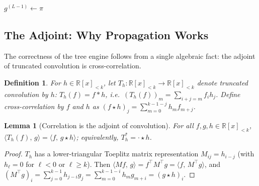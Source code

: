 \documentclass[11pt]{article}
\newtheorem{lemma}[theorem]{Lemma}
\newtheorem{definition}[theorem]{Definition}
\newcommand{\ip}[2]{\langle #1,\, #2 \rangle}
\begin{document}
\begin{algorithm}[H]
\caption{Tree Build and Propagate}\label{alg:tree}
\DontPrintSemicolon
\SetAlgoLined
{}
\BlankLine
{}
\BlankLine
{}
$g^{(L-1)} \leftarrow \pi$\;
\end{algorithm}

\subsection{The Adjoint: Why Propagation Works}

The correctness of the tree engine follows from a single algebraic fact:
the adjoint of truncated convolution is cross-correlation.

\begin{definition}
For $h \in \mathbb{R}[x]_{<k}$, let $T_h : \mathbb{R}[x]_{<k} \to
\mathbb{R}[x]_{<k}$ denote truncated convolution by $h$:
$T_h(f) = f * h$, i.e.\ $(T_h(f))_m = \sum_{i+j=m} f_i h_j$. Define
cross-correlation by $f$ and $h$ as
$(f \star h)_j = \sum_{m=0}^{k-1-j} h_m f_{m+j}$.
\end{definition}

\begin{lemma}[Correlation is the adjoint of convolution]\label{lem:adj-conv}
For all $f, g, h \in \mathbb{R}[x]_{<k}$,
$\ip{T_h(f)}{g} = \ip{f}{g \star h}$; equivalently, $T_h^{\ast} =
{\cdot} \star h$.
\end{lemma}
\begin{proof}
$T_h$ has a lower-triangular Toeplitz matrix representation
$M_{ij} = h_{i-j}$ (with $h_\ell = 0$ for $\ell < 0$ or $\ell \ge k$).
Then $\ip{Mf}{g} = f^\top M^\top g = \ip{f}{M^\top g}$, and
$(M^\top g)_i = \sum_{j=0}^{k-1} h_{j-i} g_j =
\sum_{m=0}^{k-1-i} h_m g_{m+i} = (g \star h)_i$.
\end{proof}
\end{document}
